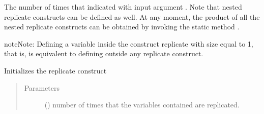 \documentclass[letterpaper,10pt,english]{sphinxmanual}
\begin{document}
\begin{fulllineitems}
\begin{sphinxVerbatim}[commandchars=\\\{\}]
    








\end{sphinxVerbatim}

The number of times that indicated with input argument .
Note that nested replicate constructs can be defined as well. At any moment,
the product of all the nested replicate constructs can be obtained by
invoking the static method .

\begin{sphinxadmonition}{note}{Note:}
Defining a variable inside the construct replicate with size equal to 1, that is,
 is equivalent to defining outside any replicate
construct.
\end{sphinxadmonition}

\begin{fulllineitems}
\label{\detokenize{modules/inferpy.models:inferpy.models.replicate.replicate.__init__}}
Initializes the replicate construct
\begin{quote}\begin{description}
\item[{Parameters}] \leavevmode
{} () \textendash{} number of times that the variables contained are replicated.

\end{description}\end{quote}


\end{fulllineitems}
\end{fulllineitems}
\end{document}
